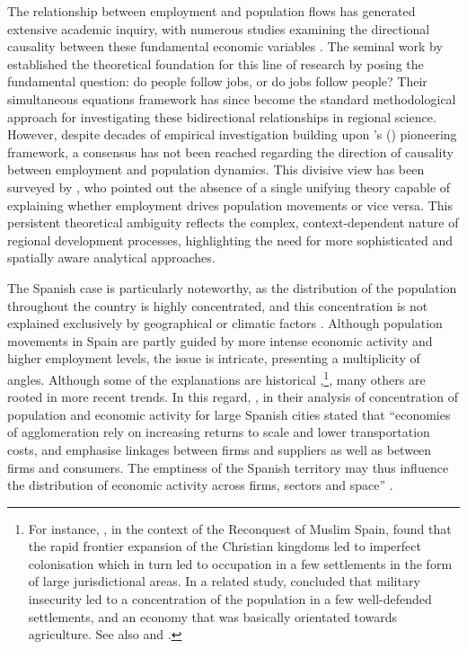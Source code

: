 \documentclass[a4paper,11pt,oneside]{article}
\begin{document}
The relationship between employment and population flows has generated extensive academic inquiry, with numerous studies examining the directional causality between these fundamental economic variables \citep[see][among others]{borts1964economic,muth1971migration,steinnes1974econometric,carlino1987determinants,boarnet1992intra,boarnet1994empirical,boarnet1994monocentric,bao1996restructuring,vias1998analysis,henry2001spatial,feser2006harnessing,cho2007spatial,dudensing2010competitiveness,kim2013land}. The seminal work by \cite{carlino1987determinants} established the theoretical foundation for this line of research by posing the fundamental question: do people follow jobs, or do jobs follow people? Their simultaneous equations framework has since become the standard methodological approach for investigating these bidirectional relationships in regional science. However, despite decades of empirical investigation building upon \citeauthor{carlino1987determinants}'s (\citeyear{carlino1987determinants}) pioneering framework, a consensus has not been reached regarding the direction of causality between employment and population dynamics. This divisive view has been surveyed by \cite{hoogstra2017jobs}, who pointed out the absence of a single unifying theory capable of explaining whether employment drives population movements or vice versa. This persistent theoretical ambiguity reflects the complex, context-dependent nature of regional development processes, highlighting the need for more sophisticated and spatially aware analytical approaches.




The Spanish case is particularly noteworthy, as the distribution of the population throughout the country is highly concentrated, and this concentration is not explained exclusively by geographical or climatic factors \citep{gutierrez2023spatial}. Although population movements in Spain are partly guided by more intense economic activity and higher employment levels, the issue is intricate, presenting a multiplicity of angles. Although some of the explanations are historical \citep{nadal1975fracaso},\footnote{For instance, \cite{oto2016economic}, in the context of the Reconquest of Muslim Spain, found that the rapid frontier expansion of the Christian kingdoms led to imperfect colonisation which in turn led to occupation in a few settlements in the form of large jurisdictional areas. In a related study, \cite{oto2020frontiers} concluded that military insecurity led to a concentration of the population in a few well-defended settlements, and an economy that was basically orientated towards agriculture. See also \cite{jimenez1989frontier} and \cite{bishko1995spanish}.}, many others are rooted in more recent trends. In this regard, \cite{gutierrez2023spatial}, in their analysis of concentration of population and economic activity for large Spanish cities stated that ``economies of agglomeration rely on increasing returns to scale and lower transportation costs, and emphasise linkages between firms and suppliers as well as between firms and consumers. The emptiness of the Spanish territory may thus influence the distribution of economic activity across firms, sectors and space'' \citep[p.748]{gutierrez2023spatial}.
\end{document}
